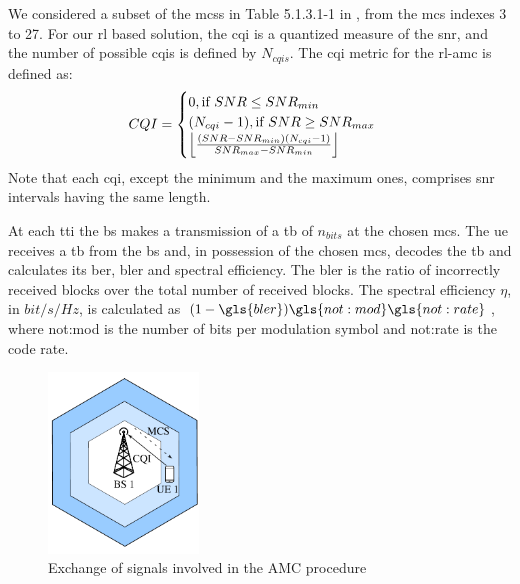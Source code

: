 We considered a subset of the \gls{mcs}s in Table 5.1.3.1-1 in \cite{3gpp.38.214}, from the \gls{mcs} indexes 3 to 27. For our \gls{rl} based solution, the \gls{cqi} is a quantized measure of the \gls{snr}, and the number of possible \gls{cqi}s is defined by $N_{cqis}$. The \gls{cqi} metric for the \gls{rl}-\gls{amc} is defined as:
\begin{equation}\label{eq:amc-cqi}
    CQI =
    \begin{cases}
    0, \text{if } SNR \leq SNR_{min}\\
    (N_{cqi}-1), \text{if } SNR \geq SNR_{max}\\
    \floor[\Big]{\frac{(SNR - SNR_{min})(N_{cqi}-1)}{SNR_{max}-SNR_{min}}}
    \end{cases}
\end{equation}
\noindent Note that each \gls{cqi}, except the minimum and the maximum ones, comprises \gls{snr} intervals having the same length.

At each \gls{tti} the \gls{bs} makes a transmission of a \gls{tb} of $n_{bits}$ at the chosen \gls{mcs}. The \gls{ue} receives a \gls{tb} from the \gls{bs} and, in possession of the chosen \gls{mcs}, decodes the \gls{tb} and calculates its \gls{ber}, \gls{bler} and spectral efficiency.
%
%
The \gls{bler} is the ratio of incorrectly received blocks over the total number of received blocks. %
%
The spectral efficiency $\eta$, in $bit/s/Hz$, is calculated as $(1-\gls{bler})\gls{not:mod}\gls{not:rate}$, where \gls{not:mod} is the number of bits per modulation symbol and \gls{not:rate} is the code rate.

\begin{figure}[tb]
\centerline{\includegraphics[width=40mm]{figures/chp_amc/system-model-mateus.pdf}}
\caption{Exchange of signals involved in the AMC procedure}
\label{fig:amc-system-model}
\end{figure}





